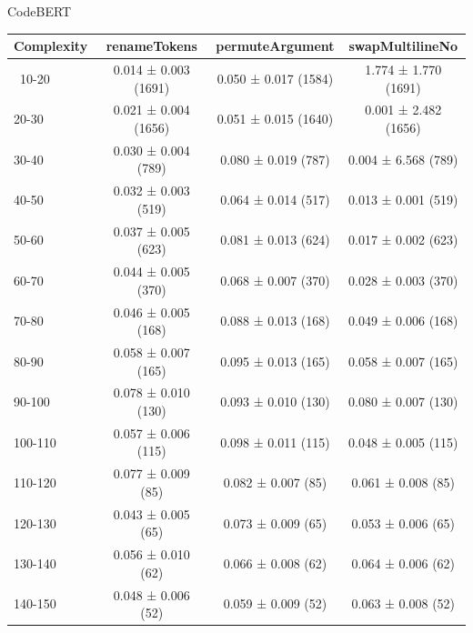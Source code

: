 \documentclass[sigconf,review,anonymous]{acmart}
\begin{document}
{  CodeBERT
    \begin{table}[H]
      \tiny
      \begin{tabular}{l|ccc}
        Complexity          & renameTokens        & permuteArgument     & swapMultilineNo     \\\hline\
        10-20               & 0.014 ± 0.003 (1691)& 0.050 ± 0.017 (1584)& 1.774 ± 1.770 (1691)\\
        20-30               & 0.021 ± 0.004 (1656)& 0.051 ± 0.015 (1640)& 0.001 ± 2.482 (1656)\\
        30-40               & 0.030 ± 0.004 (789) & 0.080 ± 0.019 (787) & 0.004 ± 6.568 (789) \\
        40-50               & 0.032 ± 0.003 (519) & 0.064 ± 0.014 (517) & 0.013 ± 0.001 (519) \\
        50-60               & 0.037 ± 0.005 (623) & 0.081 ± 0.013 (624) & 0.017 ± 0.002 (623) \\
        60-70               & 0.044 ± 0.005 (370) & 0.068 ± 0.007 (370) & 0.028 ± 0.003 (370) \\
        70-80               & 0.046 ± 0.005 (168) & 0.088 ± 0.013 (168) & 0.049 ± 0.006 (168) \\
        80-90               & 0.058 ± 0.007 (165) & 0.095 ± 0.013 (165) & 0.058 ± 0.007 (165) \\
        90-100              & 0.078 ± 0.010 (130) & 0.093 ± 0.010 (130) & 0.080 ± 0.007 (130) \\
        100-110             & 0.057 ± 0.006 (115) & 0.098 ± 0.011 (115) & 0.048 ± 0.005 (115) \\
        110-120             & 0.077 ± 0.009 (85)  & 0.082 ± 0.007 (85)  & 0.061 ± 0.008 (85)  \\
        120-130             & 0.043 ± 0.005 (65)  & 0.073 ± 0.009 (65)  & 0.053 ± 0.006 (65)  \\
        130-140             & 0.056 ± 0.010 (62)  & 0.066 ± 0.008 (62)  & 0.064 ± 0.006 (62)  \\
        140-150             & 0.048 ± 0.006 (52)  & 0.059 ± 0.009 (52)  & 0.063 ± 0.008 (52)  \\
      \end{tabular}
    \end{table}

}
\end{document}
